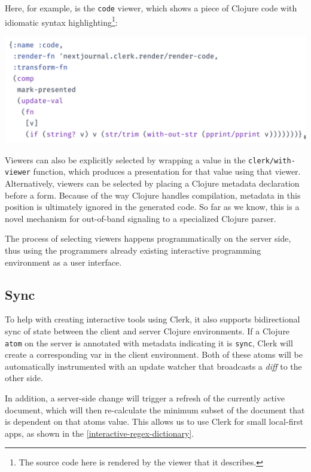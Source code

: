\documentclass[sigconf,screen]{acmart}
\newcommand{\passthrough}[1]{#1}
\begin{document}
Here, for example, is the \passthrough{\lstinline!code!} viewer, which shows a piece of Clojure code with idiomatic syntax highlighting\footnote{The source code here is rendered by the viewer that it describes.}:

\includegraphics{images/anon-expr-5drCPuwp8LirNTWeyr5WSDHWVV2rnC-result.png}

Viewers can also be explicitly selected by wrapping a value in the \passthrough{\lstinline!clerk/with-viewer!} function, which produces a presentation for that value using that viewer. Alternatively, viewers can be selected by placing a Clojure metadata declaration before a form. Because of the way Clojure handles compilation, metadata in this position is ultimately ignored in the generated code. So far as we know, this is a novel mechanism for out-of-band signaling to a specialized Clojure parser.

The process of selecting viewers happens programmatically on the server side, thus using the programmer\textquotesingle s already existing interactive programming environment as a user interface.

\hypertarget{sync}{%
\subsection{Sync}\label{sync}}

To help with creating interactive tools using Clerk, it also supports bidirectional sync of state between the client and server Clojure environments. If a Clojure \passthrough{\lstinline!atom!} on the server is annotated with metadata indicating it is \passthrough{\lstinline!sync!}, Clerk will create a corresponding var in the client environment. Both of these atoms will be automatically instrumented with an update watcher that broadcasts a \emph{diff} to the other side.

In addition, a server-side change will trigger a refresh of the currently active document, which will then re-calculate the minimum subset of the document that is dependent on that atom\textquotesingle s value. This allows us to use Clerk for small local-first apps, as shown in the \autoref{interactive-regex-dictionary}.
\end{document}
